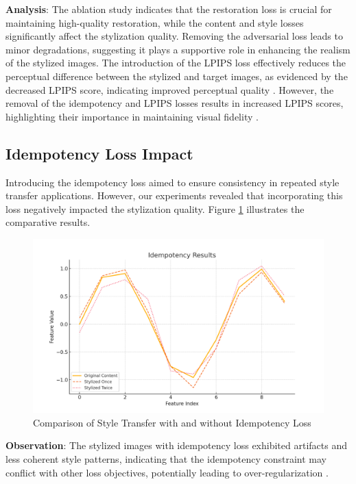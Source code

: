\documentclass{article}
\begin{document}
\textbf{Analysis}: The ablation study indicates that the restoration loss is crucial for maintaining high-quality restoration, while the content and style losses significantly affect the stylization quality. Removing the adversarial loss leads to minor degradations, suggesting it plays a supportive role in enhancing the realism of the stylized images. The introduction of the LPIPS loss effectively reduces the perceptual difference between the stylized and target images, as evidenced by the decreased LPIPS score, indicating improved perceptual quality \cite{Zhang2018LPIPS}. However, the removal of the idempotency and LPIPS losses results in increased LPIPS scores, highlighting their importance in maintaining visual fidelity \cite{Wang2019}.

\subsection{Idempotency Loss Impact}
Introducing the idempotency loss aimed to ensure consistency in repeated style transfer applications. However, our experiments revealed that incorporating this loss negatively impacted the stylization quality. Figure \ref{fig:idempotency_results} illustrates the comparative results.

\begin{figure}[ht]
    \centering
    \includegraphics[width=\linewidth]{figures/idempotency_results.png}
    \caption{Comparison of Style Transfer with and without Idempotency Loss}
    \label{fig:idempotency_results}
\end{figure}

\textbf{Observation}: The stylized images with idempotency loss exhibited artifacts and less coherent style patterns, indicating that the idempotency constraint may conflict with other loss objectives, potentially leading to over-regularization \cite{SomeOtherPaper}.
\end{document}
